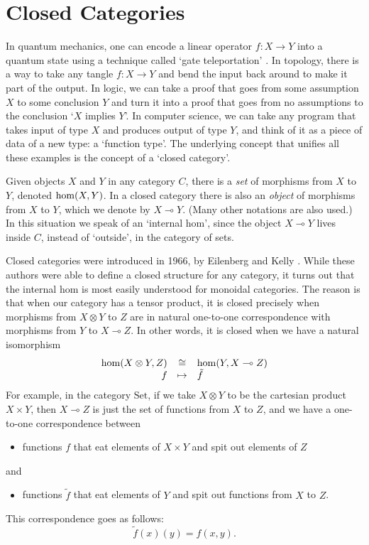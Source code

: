 \documentclass[12pt,twoside,openright]{report}
\newcommand{\Set}{\mathrm{Set}}
\newcommand{\maps}{\colon}
\newcommand{\iso}{\cong}
\newcommand{\lhom}{\multimap}
\renewcommand{\hom}{{\rm hom}}
\newcommand{\tensor}{\otimes}
\begin{document}
\section{Closed Categories}
\label{closed}

In quantum mechanics, one can encode a linear operator $f \maps X \to Y$ into a quantum state using a technique called `gate teleportation'
\cite{GC}.  In topology, there is a way to take any tangle $f \maps X
\to Y$ and bend the input back around to make it part of the output. In logic, we can take a proof that goes from some assumption $X$ to some conclusion $Y$ and turn it into a proof that goes from no assumptions to the conclusion `$X$ implies $Y$'.  In computer science, we can take any program that takes input of type $X$ and produces output of type $Y$, and think of it as a piece of data of a new type:
a `function type'.  The underlying concept that unifies all these examples is the concept of a `closed category'.

Given objects $X$ and $Y$ in any category $C$, there is a {\em set} of morphisms from $X$ to $Y$, denoted $\hom(X,Y)$.  In a closed category there is also an {\em object} of morphisms from $X$ to $Y$, which we denote by $X \lhom Y$.  (Many other notations are also used.)  In this situation we speak of an `internal hom', since the object $X \lhom Y$
lives inside $C$, instead of `outside', in the category of sets.

Closed categories were introduced in 1966, by Eilenberg and Kelly \cite{EK}. While these authors were able to define a closed structure for any category, it turns out that the internal hom is most easily understood for monoidal categories.  The reason is that when our category has a tensor product, it is closed precisely when morphisms from $X \tensor Y$
to $Z$ are in natural one-to-one correspondence with morphisms from $Y$
to $X \lhom Z$.  In other words, it is closed when we have a natural isomorphism
\[  
\begin{array}{rcl}       
 \hom(X \tensor Y , Z) &\iso & \hom(Y, X \lhom Z)  \\
                    f &\mapsto & \tilde{f}  
\end{array}
\]
For example, in the category $\Set$, if we take
$X \tensor Y$ to be the cartesian product $X \times Y$, then 
$X \lhom Z$ is just the set of functions from $X$ to $Z$, and we have a one-to-one correspondence between
\begin{itemize}
\item functions $f$ that eat elements of
$X \times Y$ and spit out elements of $Z$ 
\end{itemize}
and 
\begin{itemize}
\item functions $\tilde{f}$ that eat elements of $Y$ and spit out functions from $X$ to $Z$.
\end{itemize}
This correspondence goes as follows:
\[          \tilde{f}(x)(y) = f(x,y)  .\]
\end{document}
